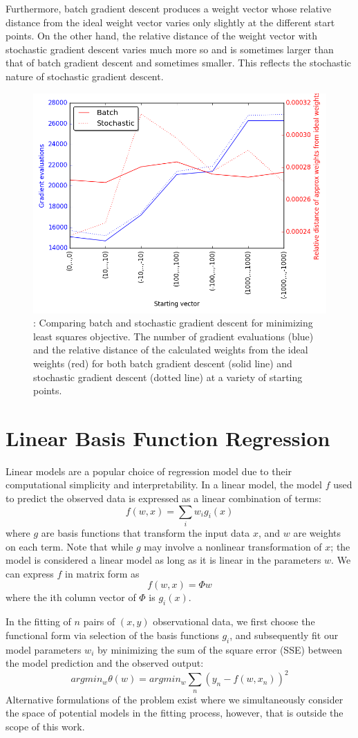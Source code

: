 \documentclass[10pt]{article}
\begin{document}
\medskip

Furthermore, batch gradient descent produces a weight vector whose relative distance from the ideal weight vector varies only slightly at the different start points. On the other hand, the relative distance of the weight vector with stochastic gradient descent varies much more so and is sometimes larger than that of batch gradient descent and sometimes smaller. This reflects the stochastic nature of stochastic gradient descent.

\begin{figure}
\centering
\includegraphics[width=.4\textwidth,height =0.25\textheight]{batch_stochastic_comp.png}
\caption{\label{fig:1.3}: Comparing batch and stochastic gradient descent for minimizing least squares objective. The number of gradient evaluations (blue) and the relative distance of the calculated weights from the ideal weights (red) for both batch gradient descent (solid line) and stochastic gradient descent (dotted line) at a variety of starting points.}
\end{figure}

\section{Linear Basis Function Regression}

Linear models are a popular choice of regression model due to their computational simplicity and interpretability. In a linear model, the model $f$ used to predict the observed data is expressed as a linear combination of terms:
$$ f(w,x) = \sum_i w_ig_i(x) $$
where $g$ are basis functions that transform the input data $x$, and $w$ are weights on each term. Note that while $g$ may involve a nonlinear transformation of $x$; the model is considered a linear model as long as it is linear in the parameters $w$. We can express $f$ in matrix form as
$$f(w,x) = \Phi w$$
where the ith column vector of $\Phi$ is $g_i(x)$. 

In the fitting of $n$ pairs of $(x,y)$ observational data, we first choose the functional form via selection of the basis functions $g_i$, and subsequently fit our model parameters $w_i$ by minimizing the sum of the square error (SSE) between the model prediction and the observed output: 
$$ argmin_w \theta(w) = argmin_w \sum_n (y_n - f(w,x_n))^2$$ %
Alternative formulations of the problem exist where we simultaneously consider the space of potential models in the fitting process, however, that is outside the scope of this work.
\end{document}
